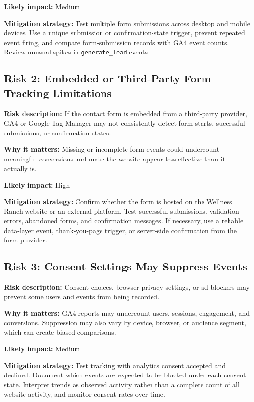 \documentclass[
  letterpaper,
  DIV=11,
  numbers=noendperiod]{scrartcl}
\begin{document}
\textbf{Likely impact:} Medium

\textbf{Mitigation strategy:} Test multiple form submissions across
desktop and mobile devices. Use a unique submission or
confirmation-state trigger, prevent repeated event firing, and compare
form-submission records with GA4 event counts. Review unusual spikes in
\texttt{generate\_lead} events.

\subsection{Risk 2: Embedded or Third-Party Form Tracking
Limitations}\label{risk-2-embedded-or-third-party-form-tracking-limitations}

\textbf{Risk description:} If the contact form is embedded from a
third-party provider, GA4 or Google Tag Manager may not consistently
detect form starts, successful submissions, or confirmation states.

\textbf{Why it matters:} Missing or incomplete form events could
undercount meaningful conversions and make the website appear less
effective than it actually is.

\textbf{Likely impact:} High

\textbf{Mitigation strategy:} Confirm whether the form is hosted on the
Wellness Ranch website or an external platform. Test successful
submissions, validation errors, abandoned forms, and confirmation
messages. If necessary, use a reliable data-layer event, thank-you-page
trigger, or server-side confirmation from the form provider.

\subsection{Risk 3: Consent Settings May Suppress
Events}\label{risk-3-consent-settings-may-suppress-events}

\textbf{Risk description:} Consent choices, browser privacy settings, or
ad blockers may prevent some users and events from being recorded.

\textbf{Why it matters:} GA4 reports may undercount users, sessions,
engagement, and conversions. Suppression may also vary by device,
browser, or audience segment, which can create biased comparisons.

\textbf{Likely impact:} Medium

\textbf{Mitigation strategy:} Test tracking with analytics consent
accepted and declined. Document which events are expected to be blocked
under each consent state. Interpret trends as observed activity rather
than a complete count of all website activity, and monitor consent rates
over time.
\end{document}
